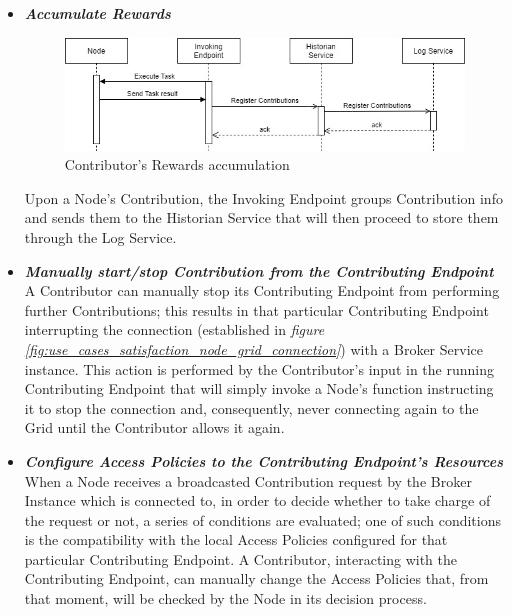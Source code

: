 \begin{itemize}
    \begin{itemize}
        \item \textbf{\textit{Accumulate Rewards}}\\
        \begin{figure}[!ht]
            \centering
            \includegraphics[scale=0.6]{document/chapters/chapter_6/images/use_cases_satisfaction_rewards_accumulation.jpg}
            \caption{Contributor's Rewards accumulation}
            \label{fig:use_cases_satisfaction_rewards_accumulation}
        \end{figure}

        Upon a Node's Contribution, the Invoking Endpoint groups Contribution info and sends them to the Historian Service that will then proceed to store them through the Log Service.

        \item \textbf{\textit{Manually start/stop Contribution from the Contributing Endpoint}}\\
        A Contributor can manually stop its Contributing Endpoint from performing further Contributions; this results in that particular Contributing Endpoint interrupting the connection (established in \textit{figure \ref{fig:use_cases_satisfaction_node_grid_connection}}) with a Broker Service instance.
        This action is performed by the Contributor's input in the running Contributing Endpoint that will simply invoke a Node's function instructing it to stop the connection and, consequently, never connecting again to the Grid until the Contributor allows it again.

        \item \textbf{\textit{Configure Access Policies to the Contributing Endpoint's Resources}}\\
        When a Node receives a broadcasted Contribution request by the Broker Instance which is connected to, in order to decide whether to take charge of the request or not, a series of conditions are evaluated; one of such conditions is the compatibility with the local Access Policies configured for that particular Contributing Endpoint. 
        A Contributor, interacting with the Contributing Endpoint, can manually change the Access Policies that, from that moment, will be checked by the Node in its decision process. 


\end{itemize}
\end{itemize}
